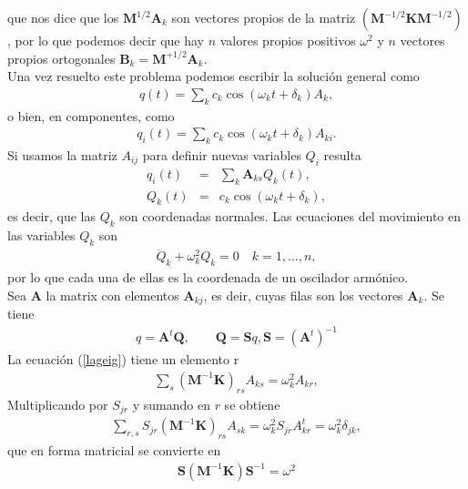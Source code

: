 \documentclass[letterpaper,12pt,oneside]{book}
\begin{document}
%
que nos dice que los $\textbf{M}^{1/2}\textbf{A}_k$ son vectores propios de la matriz $\left(\textbf{M}^{-1/2}\textbf{K}\textbf{M}^{-1/2}\right)$, por lo que podemos decir que hay $n$ valores propios positivos $\omega^2$ y $n$ vectores propios ortogonales $\textbf{B}_k=\textbf{M}^{+1/2}\textbf{A}_k$.\\
Una vez resuelto este problema podemos escribir la soluci\'on general como
%
\begin{eqnarray}
q(t)=\sum_{k}c_k \cos(\omega_k t + \delta_k)A_k,
\end{eqnarray}
%
o bien, en componentes, como
%
\begin{eqnarray}
q_i(t)=\sum_{k}c_k\cos(\omega_k t + \delta_k)A_{ki}.
\end{eqnarray}
%
Si usamos la matriz $A_{ij}$ para definir nuevas variables $Q_i$ resulta
%
\begin{eqnarray}
q_i(t)&=&\sum_{k}\textbf{A}_{ks}Q_k(t),\\
Q_k(t)&=&c_k \cos(\omega_k t + \delta_k),
\end{eqnarray}
% 
es decir, que las $Q_k$ son coordenadas normales. Las ecuaciones del movimiento en las variables $Q_k$ son 
%
\begin{eqnarray}
\ddot Q_k + \omega_k^2 Q_k = 0 \quad k=1,\dots,n,
\end{eqnarray}
%
por lo que cada una de ellas es la coordenada de un oscilador arm\'onico. \\
%
Sea \textbf{A} la matrix con elementos $\textbf{A}_{kj}$, es deir, cuyas filas son los vectores $\textbf{A}_k$. Se tiene 
%
\begin{eqnarray}
q=\textbf{A}^t\textbf{Q}, \qquad \textbf{Q}= \textbf{S}q, \textbf{S}=(\textbf{A}^t)^{-1}\label{matrixlag}
\end{eqnarray}
%
La ecuaci\'on (\ref{lageig}) tiene un elemento r 
%
\begin{eqnarray}
\sum_s\left(\textbf{M}^{-1}\textbf{K} \right)_{rs} A_{ks} = \omega_k^2 A_{kr},
\end{eqnarray}
%
Multiplicando por $S_{jr}$ y sumando en $r$ se obtiene 
%
\begin{eqnarray}
\sum_{r,s} S_{jr}\left(\textbf{M}^{-1}\textbf{K} \right)_{rs} A_{sk} = \omega_k^2 S_{jr} A^t_{kr} = \omega_k^2 \delta_{jk},
\end{eqnarray}
%
que en forma matricial se convierte en
%
\begin{eqnarray}
\textbf{S}\left(\textbf{M}^{-1}\textbf{K}\right)\textbf{S}^{-1}=\omega^2\label{omegacuad}
\end{eqnarray}
\end{document}
